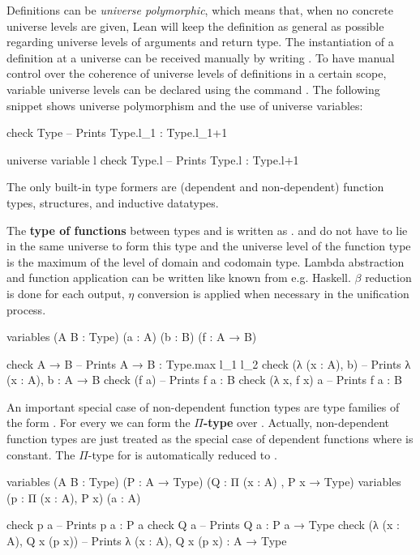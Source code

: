 Definitions can be \emph{universe polymorphic}, which means that, when no concrete
universe levels are given, Lean will keep the definition as general as possible
regarding universe levels of arguments and return type.
The instantiation of a definition  at a universe  can be received
manually by writing .
To have manual control over the coherence of universe levels of definitions in
a certain scope, variable universe levels can be declared using the command
. The following snippet shows universe polymorphism
and the use of universe variables:
\begin{leancode}
check Type -- Prints Type.{l_1} : Type.{l_1+1}

universe variable l
check Type.{l} -- Prints Type.{l} : Type.{l+1}
\end{leancode}

The only built-in type formers are (dependent and non-dependent) function types,
structures, and inductive datatypes.

The \textbf{type of functions} between types  and  is written
as .
 and  do not have to lie in the same universe to form this type
and the universe level of the function type is the maximum of the level of domain
and codomain type.
Lambda abstraction and function application can be written like known from e.g.
Haskell.
$\beta$ reduction is done for each output, $\eta$ conversion is applied when necessary
in the unification process.
\begin{leancode}
variables (A B : Type) (a : A) (b : B) (f : A → B)

check A → B -- Prints A → B : Type.{max l_1 l_2}
check (λ (x : A), b) -- Prints λ (x : A), b : A → B
check (f a) -- Prints f a : B
check (λ x, f x) a -- Prints f a : B
\end{leancode}

An important special case of non-dependent function types are type families
of the form . For every  we can form the
\textbf{$\Pi$-type}  over .
Actually, non-dependent function types are just treated as the special case of
dependent functions where  is constant.
The $\Pi$-type  for  is automatically reduced
to .
\begin{leancode}
variables (A B : Type) (P : A → Type) (Q : Π (x : A) , P x → Type)
variables (p : Π (x : A), P x) (a : A)

check p a -- Prints p a : P a
check Q a -- Prints Q a : P a → Type
check (λ (x : A), Q x (p x)) -- Prints λ (x : A), Q x (p x) : A → Type
\end{leancode}

